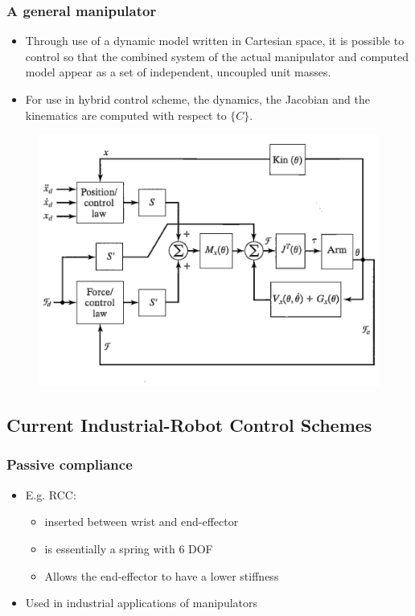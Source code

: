 \documentclass[10pt,a4paper]{article}
\begin{document}
\subsubsection{A general manipulator}
\begin{itemize}
	\item Through use of a dynamic model written in Cartesian space, it is possible to control so that the combined system of the actual manipulator and computed model appear as a set of independent, uncoupled unit masses.
	\item For use in hybrid control scheme, the dynamics, the Jacobian and the kinematics are computed with respect to $\{C\}$.
\end{itemize}

\begin{figure}[H]
	\includegraphics[width=0.5\columnwidth]{imgs/hybrid_control_general.png}
\end{figure}

\subsection{Current Industrial-Robot Control Schemes}
\subsubsection{Passive compliance}
\begin{itemize}
	\item E.g. RCC:
	\begin{itemize}
		\item inserted between wrist and end-effector 
		\item is essentially a spring with 6 DOF
		\item Allows the end-effector to have a lower stiffness
	\end{itemize}
	\item Used in industrial applications of manipulators
\end{itemize}

\end{document}

